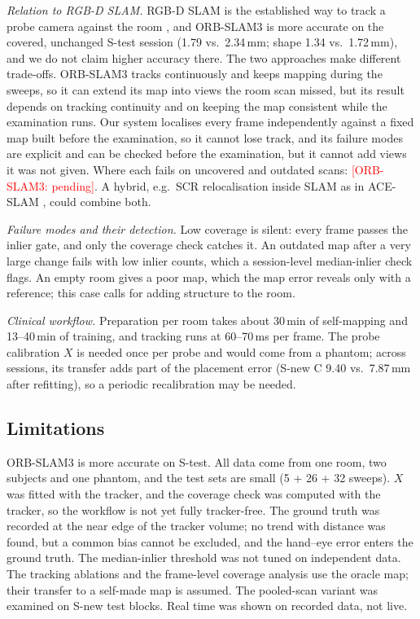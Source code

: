 \documentclass[journal]{IEEEtran}
\newcommand{\ORBP}{\textcolor{red}{[ORB-SLAM3: pending]}}
\newcommand{\Stest}{S-test}
\newcommand{\Snew}{S-new}
\begin{document}
\emph{Relation to RGB-D SLAM.} RGB-D SLAM is the established way to track a probe camera against the room \cite{busam2018insideout}, and ORB-SLAM3 is more accurate on the covered, unchanged \Stest{} session (1.79 vs.\ 2.34\,mm; shape 1.34 vs.\ 1.72\,mm), and we do not claim higher accuracy there. The two approaches make different trade-offs. ORB-SLAM3 tracks continuously and keeps mapping during the sweeps, so it can extend its map into views the room scan missed, but its result depends on tracking continuity and on keeping the map consistent while the examination runs. Our system localises every frame independently against a fixed map built before the examination, so it cannot lose track, and its failure modes are explicit and can be checked before the examination, but it cannot add views it was not given. Where each fails on uncovered and outdated scans: \ORBP. A hybrid, e.g.\ SCR relocalisation inside SLAM as in ACE-SLAM \cite{alzugaray2025aceslam}, could combine both.

\emph{Failure modes and their detection.} Low coverage is silent: every frame passes the inlier gate, and only the coverage check catches it. An outdated map after a very large change fails with low inlier counts, which a session-level median-inlier check flags. An empty room gives a poor map, which the map error reveals only with a reference; this case calls for adding structure to the room.

\emph{Clinical workflow.} Preparation per room takes about 30\,min of self-mapping and 13--40\,min of training, and tracking runs at 60--70\,ms per frame. The probe calibration $X$ is needed once per probe and would come from a phantom; across sessions, its transfer adds part of the placement error (\Snew{} C 9.40 vs.\ 7.87\,mm after refitting), so a periodic recalibration may be needed.

\subsection{Limitations}
ORB-SLAM3 is more accurate on \Stest{}. All data come from one room, two subjects and one phantom, and the test sets are small (5 + 26 + 32 sweeps). $X$ was fitted with the tracker, and the coverage check was computed with the tracker, so the workflow is not yet fully tracker-free. The ground truth was recorded at the near edge of the tracker volume; no trend with distance was found, but a common bias cannot be excluded, and the hand--eye error enters the ground truth. The median-inlier threshold was not tuned on independent data. The tracking ablations and the frame-level coverage analysis use the oracle map; their transfer to a self-made map is assumed. The pooled-scan variant was examined on \Snew{} test blocks. Real time was shown on recorded data, not live.
\end{document}

